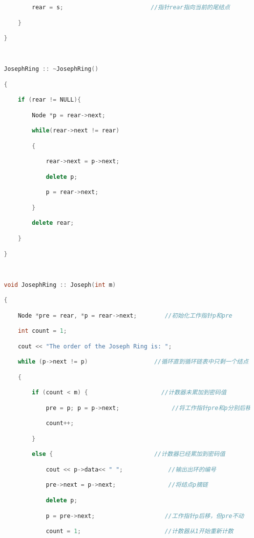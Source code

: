 \begin{lstlisting}[language=C++]
        rear = s;                         //指针rear指向当前的尾结点

    }

}

  

JosephRing :: ~JosephRing()

{

    if (rear != NULL){

        Node *p = rear->next;

        while(rear->next != rear)

        {

            rear->next = p->next;

            delete p;

            p = rear->next;

        }

        delete rear;

    }

}

  

void JosephRing :: Joseph(int m)  

{    

    Node *pre = rear, *p = rear->next;        //初始化工作指针p和pre

    int count = 1;                        

    cout << "The order of the Joseph Ring is: ";

    while (p->next != p)                   //循环直到循环链表中只剩一个结点

    {

        if (count < m) {                     //计数器未累加到密码值

            pre = p; p = p->next;               //将工作指针pre和p分别后移

            count++;                                    

        }

        else {                             //计数器已经累加到密码值

            cout << p->data<< " ";             //输出出环的编号

            pre->next = p->next;               //将结点p摘链

            delete p;                    

            p = pre->next;                    //工作指针p后移，但pre不动

            count = 1;                        //计数器从1开始重新计数


\end{lstlisting}
